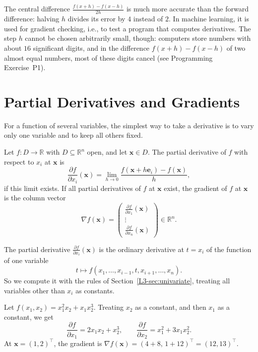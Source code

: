 The central difference $\frac{f(x + h) - f(x - h)}{2h}$ is much more accurate than the forward difference: halving $h$ divides its error by $4$ instead of $2$. In machine learning, it is used for gradient checking, i.e., to test a program that computes derivatives. The step $h$ cannot be chosen arbitrarily small, though: computers store numbers with about $16$ significant digits, and in the difference $f(x + h) - f(x - h)$ of two almost equal numbers, most of these digits cancel (see Programming Exercise~P1).

\section{Partial Derivatives and Gradients}\label{L3-sec:gradients}

For a function of several variables, the simplest way to take a derivative is to vary only one variable and to keep all others fixed.

\begin{definition}\label{L3-def:partial}
    Let $f: D \to \mathbb{R}$ with $D \subseteq \mathbb{R}^n$ open, and let $\mathbf{x} \in D$. The partial derivative of $f$ with respect to $x_i$ at $\mathbf{x}$ is
    \[\frac{\partial f}{\partial x_i}(\mathbf{x}) = \lim_{h \to 0} \frac{f(\mathbf{x} + h\mathbf{e}_i) - f(\mathbf{x})}{h},\]
    if this limit exists. If all partial derivatives of $f$ at $\mathbf{x}$ exist, the gradient of $f$ at $\mathbf{x}$ is the column vector
    \[\nabla f(\mathbf{x}) = \begin{pmatrix} \frac{\partial f}{\partial x_1}(\mathbf{x}) \\ \vdots \\ \frac{\partial f}{\partial x_n}(\mathbf{x}) \end{pmatrix} \in \mathbb{R}^n.\]
\end{definition}

The partial derivative $\frac{\partial f}{\partial x_i}(\mathbf{x})$ is the ordinary derivative at $t = x_i$ of the function of one variable
\[t \mapsto f(x_1, \ldots, x_{i-1}, t, x_{i+1}, \ldots, x_n).\]
So we compute it with the rules of Section~\ref{L3-sec:univariate}, treating all variables other than $x_i$ as constants.

\begin{example}\label{L3-ex:partials}
    Let $f(x_1, x_2) = x_1^2 x_2 + x_1 x_2^3$. Treating $x_2$ as a constant, and then $x_1$ as a constant, we get
    \[\frac{\partial f}{\partial x_1} = 2x_1 x_2 + x_2^3, \qquad \frac{\partial f}{\partial x_2} = x_1^2 + 3x_1 x_2^2.\]
    At $\mathbf{x} = (1, 2)^\top$, the gradient is $\nabla f(\mathbf{x}) = (4 + 8, \, 1 + 12)^\top = (12, 13)^\top$.
\end{example}

